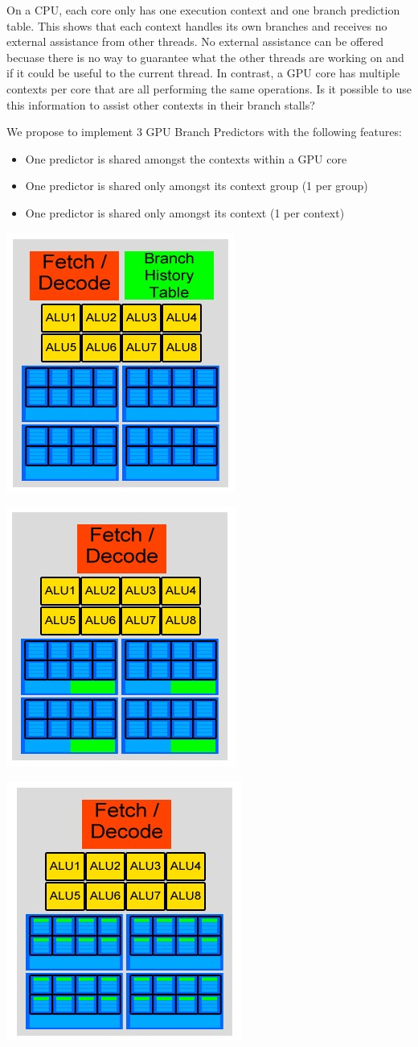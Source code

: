 \documentclass[conference]{IEEEtran}
\begin{document}
On a CPU, each core only has one execution context and one branch prediction table.  This shows that each context handles its own branches and receives no external assistance from other threads.  No external assistance can be offered becuase there is no way to guarantee what the other threads are working on and if it could be useful to the current thread.  In contrast, a GPU core has multiple contexts per core that are all performing the same operations.  Is it possible to use this information to assist other contexts in their branch stalls?

We propose to implement 3 GPU Branch Predictors with the following features:
\begin{itemize}
	\item One predictor is shared amongst the contexts within a GPU core
	\item One predictor is shared only amongst its context group (1 per group)
	\item One predictor is shared only amongst its context (1 per context)
\end{itemize}

\begin{center}
	\includegraphics[width=.2\textwidth]{Our-GPU---per-core-predictor.jpg}
\end{center}

\begin{center}
	\includegraphics[width=.2\textwidth]{Our-GPU---per-context-group-predictor.jpg}
\end{center}

\begin{center}
	\includegraphics[width=.2\textwidth]{Our-GPU---per-element-predictor.jpg}
\end{center}
\end{document}
